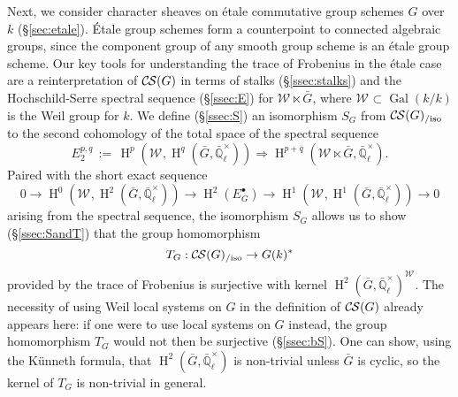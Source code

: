 \documentclass[10pt]{amsart}
\theoremstyle{plain}
\theoremstyle{definition}
\theoremstyle{remark}
\newcommand{\EE}{\mathbb{\bar Q}_\ell}
\newcommand{\bFq}{\bar{k}}
\newcommand{\Fq}{k}
\newcommand{\EEx}{\EE^\times}
\newcommand{\Weil}[1]{\mathcal{W}_{#1}}
\DeclareMathOperator{\Gal}{Gal}
\DeclareMathOperator{\Hom}{Hom}
\DeclareMathOperator{\Hh}{H}
\newcommand{\ceq}{{\, :=\, }}
\newcommand{\TrFrob}[1]{T_{#1}}
\newcommand{\gcs}[1]{{\mathcal{\bar #1}}}
\newcommand{\CS}{{\mathcal{C\hskip-0.8pt S}}}
\newcommand{\CSiso}[1]{\CS(#1)_{/\text{iso}}}
\newcommand{\bG}{\bar{G}}
\begin{document}
Next, we consider character sheaves on \'etale commutative group schemes $G$ over $\Fq$ (\S\ref{sec:etale}).
\'Etale group schemes form a counterpoint to connected algebraic groups, since the component group of any smooth group scheme is an \'etale group scheme.
Our key tools for understanding the trace of Frobenius in the \'etale case 
are a reinterpretation of $\CS(G)$ in terms of stalks (\S\ref{ssec:stalks}) and 
 the Hochschild-Serre spectral sequence (\S\ref{ssec:E}) for $\Weil{} \ltimes \bG$, where $\Weil{} \subset \Gal(\Fq/\Fq)$ is the Weil group for $\Fq$.
We define (\S\ref{ssec:S}) an isomorphism $S_G$ from $\CSiso{G}$ to the second cohomology of the total space of the spectral sequence
\[
E_2^{p,q} \ceq \Hh^p(\Weil{}, \Hh^q(\bG, \EEx)) \Rightarrow \Hh^{p+q}(\Weil{} \ltimes \bG, \EEx).
\]
Paired with the short exact sequence
\[
  0 \to \Hh^0(\Weil{},\Hh^2(\bG,\EEx)) \to \Hh^2(E^\bullet_G) \to \Hh^1(\Weil{},\Hh^1(\bG,\EEx)) \to 0
\]
arising from the spectral sequence, the isomorphism $S_G$ allows us to show (\S\ref{ssec:SandT}) that 
the group homomorphism 
\[
\TrFrob{G}: \CSiso{G} \to G(\Fq)^*
\]
provided by the trace of Frobenius is surjective with kernel $\Hh^2(\bG,\EEx)^{\Weil{}}$.
The necessity of using Weil local systems on $G$ in the definition of $\CS(G)$ already appears here:  if one were to use local systems on $G$ instead, the group homomorphism $\TrFrob{G}$ would not then be surjective (\S \ref{ssec:bS}). 
One can show, using the K\"unneth formula, that $\Hh^2(\bG,\EEx)$ is non-trivial unless $\bG$ is cyclic, so the kernel of $\TrFrob{G}$ is non-trivial in general.


\end{document}
